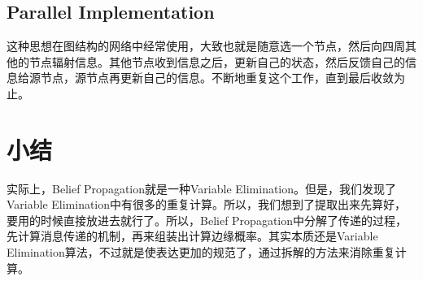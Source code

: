 \documentclass[a4paper]{article}
\begin{document}
\subsection{Parallel Implementation}
这种思想在图结构的网络中经常使用，大致也就是随意选一个节点，然后向四周其他的节点辐射信息。其他节点收到信息之后，更新自己的状态，然后反馈自己的信息给源节点，源节点再更新自己的信息。不断地重复这个工作，直到最后收敛为止。

\section{小结}
实际上，Belief Propagation就是一种Variable Elimination。但是，我们发现了Variable Elimination中有很多的重复计算。所以，我们想到了提取出来先算好，要用的时候直接放进去就行了。所以，Belief Propagation中分解了传递的过程，先计算消息传递的机制，再来组装出计算边缘概率。其实本质还是Variable Elimination算法，不过就是使表达更加的规范了，通过拆解的方法来消除重复计算。
\end{document}
